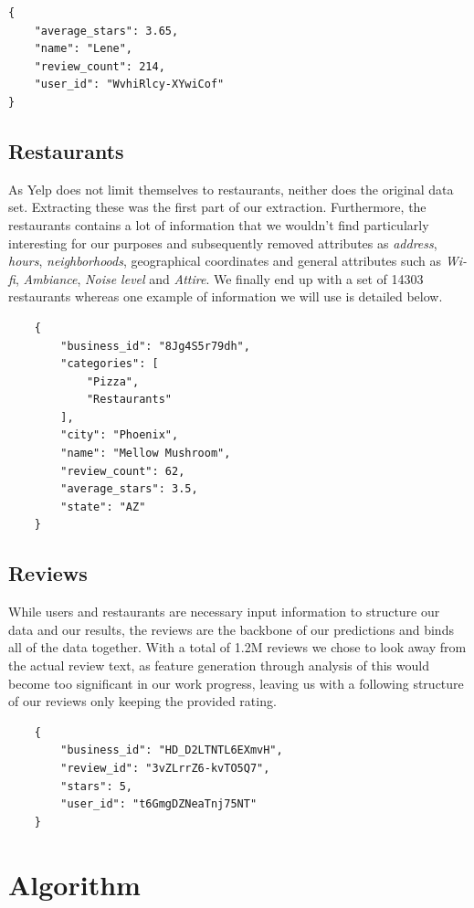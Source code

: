 \documentclass[10pt,twocolumn,letterpaper]{article}
\begin{document}
\begin{verbatim}
{
    "average_stars": 3.65,
    "name": "Lene",
    "review_count": 214,
    "user_id": "WvhiRlcy-XYwiCof"
}
\end{verbatim}

\subsection{Restaurants}
As Yelp does not limit themselves to restaurants, neither does the original data set. Extracting these was the first part of our extraction. Furthermore, the restaurants contains a lot of information that we wouldn't find particularly interesting for our purposes and subsequently removed attributes as \textit{address}, \textit{hours}, \textit{neighborhoods}, geographical coordinates and general attributes such as \textit{Wi-fi}, \textit{Ambiance}, \textit{Noise level} and \textit{Attire}. We finally end up with a set of 14303 restaurants whereas one example of information we will use is detailed below.

\begin{verbatim}
	{
	    "business_id": "8Jg4S5r79dh",
	    "categories": [
	        "Pizza",
	        "Restaurants"
	    ],
	    "city": "Phoenix",
	    "name": "Mellow Mushroom",
	    "review_count": 62,
	    "average_stars": 3.5,
	    "state": "AZ"
	}
\end{verbatim}

\subsection{Reviews}
While users and restaurants are necessary input information to structure our data and our results, the reviews are the backbone of our predictions and binds all of the data together. With a total of 1.2M reviews we chose to look away from the actual review text, as feature generation through analysis of this would become too significant in our work progress, leaving us with a following structure of our reviews only keeping the provided rating.

\begin{verbatim}
	{
	    "business_id": "HD_D2LTNTL6EXmvH",
	    "review_id": "3vZLrrZ6-kvTO5Q7",
	    "stars": 5,
	    "user_id": "t6GmgDZNeaTnj75NT"
	}
\end{verbatim}

\section{Algorithm}
\end{document}
